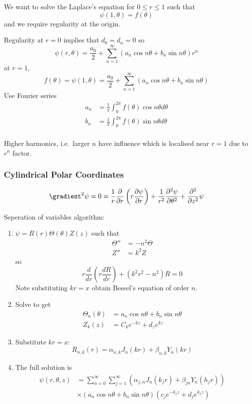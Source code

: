 \documentclass[a4paper]{article}
\newcommand*\grad{\gradient}
\newcommand*\laplace{\grad^2}
\newcommand*\lap{\laplace}
\begin{document}
We want to solve the Laplace's equation for \(0 \leq r \leq 1\) such that
\[
  \psi(1, \theta) = f(\theta)
\]
and we require regularity at the origin.

Regularity at \(r = 0\) implies that \(d_0 = d_n = 0\) so
\[
  \psi(r, \theta) = \frac{a_0}{2} + \sum_{n = 1}^{\infty}(a_n \cos n\theta + b_n \sin n\theta) r^n
\]
at \(r = 1\),
\[
  f(\theta) = \psi(1, \theta) = \frac{a_0}{2} + \sum_{n = 1}^{\infty}(a_n \cos n\theta + b_n \sin n\theta)
\]
Use Fourier series
\begin{align*}
  a_n &= \frac{1}{\pi} \int_{0}^{2\pi} f(\theta) \cos n\theta d\theta \\
  b_n &= \frac{1}{\pi} \int_{0}^{2\pi} f(\theta) \sin n\theta d\theta \\
\end{align*}

\begin{note}
  Higher harmonics, i.e.\ larger \(n\) have influence which is localised near \(r = 1\) due to \(r^n\) factor.
\end{note}

\subsubsection{Cylindrical Polar Coordinates}

\[
  \lap \psi = 0 = \frac{1}{r} \frac{\partial  }{\partial r} \left( r \frac{\partial \psi}{\partial r} \right) + \frac{1}{r^2} \frac{\partial^2 \psi}{\partial \theta^2} + \frac{\partial^2  }{\partial z^2} \psi
\]

Seperation of variables algorithm:
\begin{enumerate}
\item \(\psi = R(r) \Theta(\theta) Z(z)\) such that
  \begin{align*}
    \Theta'' &= -n^2 \Theta \\
    Z'' &= k^2 Z
  \end{align*}
  so
  \[
    r \frac{d}{dr} \left( r \frac{dR}{dr} \right) + (k^2r^2 - n^2)R = 0
  \]
  Note substituting \(kr = x\) obtain Bessel's equation of order \(n\).
\item Solve to get
  \begin{align*}
    \Theta_n(\theta) &= a_n \cos n\theta + b_n \sin n\theta \\
    Z_k(z) &= C_k e^{-kz} + d_z e^{kz}
  \end{align*}
\item Substitute \(kr = x\):
  \[
    R_{n,k}(r) = \alpha_{n, k} J_n(kr) + \beta_{n, k} Y_n(kr)
  \]
\item The full solution is
  \begin{align*}
    \psi(r, \theta, z) &= \sum_{n = 0}^{\infty} \sum_{j = 1}^{\infty} \left( \alpha_{j,n} J_n(k_jr) + \beta_{jn}Y_n(h_jr) \right) \\
    & \times (a_n \cos n\theta + b_n \sin n\theta ) (c_j e^{-k_j z} + d_j e^{k_j z})
  \end{align*}
\end{enumerate}
\end{document}
